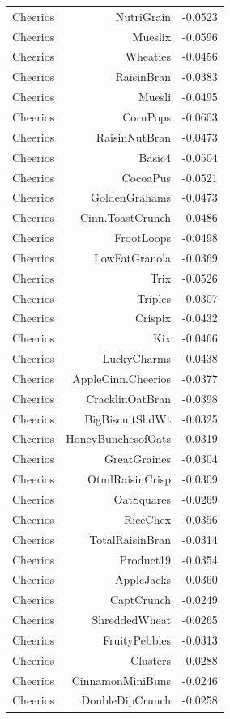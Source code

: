 \begin{longtable}{@{}lrr@{}}
Cheerios & NutriGrain & -0.0523 \\
Cheerios & Mueslix & -0.0596 \\
Cheerios & Wheaties & -0.0456 \\
Cheerios & RaisinBran & -0.0383 \\
Cheerios & Muesli & -0.0495 \\
Cheerios & CornPops & -0.0603 \\
Cheerios & RaisinNutBran & -0.0473 \\
Cheerios & Basic4 & -0.0504 \\
Cheerios & CocoaPus & -0.0521 \\
Cheerios & GoldenGrahams & -0.0473 \\
Cheerios & Cinn.ToastCrunch & -0.0486 \\
Cheerios & FrootLoops & -0.0498 \\
Cheerios & LowFatGranola & -0.0369 \\
Cheerios & Trix & -0.0526 \\
Cheerios & Triples & -0.0307 \\
Cheerios & Crispix & -0.0432 \\
Cheerios & Kix & -0.0466 \\
Cheerios & LuckyCharms & -0.0438 \\
Cheerios & AppleCinn.Cheerios & -0.0377 \\
Cheerios & CracklinOatBran & -0.0398 \\
Cheerios & BigBiscuitShdWt & -0.0325 \\
Cheerios & HoneyBunchesofOats & -0.0319 \\
Cheerios & GreatGraines & -0.0304 \\
Cheerios & OtmlRaisinCrisp & -0.0309 \\
Cheerios & OatSquares & -0.0269 \\
Cheerios & RiceChex & -0.0356 \\
Cheerios & TotalRaisinBran & -0.0314 \\
Cheerios & Product19 & -0.0354 \\
Cheerios & AppleJacks & -0.0360 \\
Cheerios & CaptCrunch & -0.0249 \\
Cheerios & ShreddedWheat & -0.0265 \\
Cheerios & FruityPebbles & -0.0313 \\
Cheerios & Clusters & -0.0288 \\
Cheerios & CinnamonMiniBuns & -0.0246 \\
Cheerios & DoubleDipCrunch & -0.0258 \\

\end{longtable}
